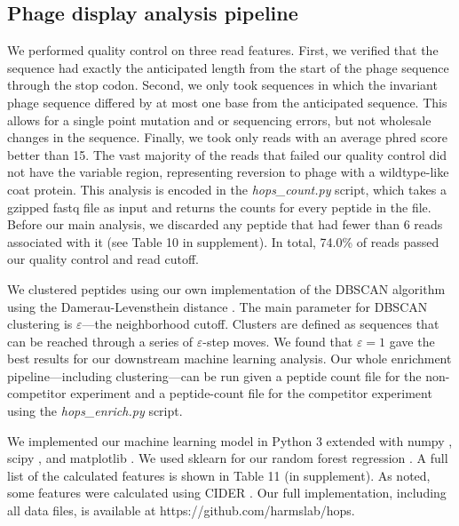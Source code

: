 \subsection{Phage display analysis pipeline}

We performed quality control on three read features. First, we verified
that the sequence had exactly the anticipated length from the start
of the phage sequence through the stop codon. Second, we only took
sequences in which the invariant phage sequence differed by at most
one base from the anticipated sequence. This allows for a single point
mutation and or sequencing errors, but not wholesale changes in the
sequence. Finally, we took only reads with an average phred score
better than 15. The vast majority of the reads that failed our quality
control did not have the variable region, representing reversion to
phage with a wildtype-like coat protein. This analysis is encoded
in the \emph{hops\_count.py }script, which takes a gzipped fastq file
as input and returns the counts for every peptide in the file. Before
our main analysis, we discarded any peptide that had fewer than 6
reads associated with it (see Table 10 in supplement).
In total, 74.0\% of reads passed our quality control and read cutoff. 

We clustered peptides using our own implementation of the DBSCAN algorithm
\citep{ester_density-based_1996} using the Damerau-Levensthein distance
\citep{damerau_technique_1964}. The main parameter for DBSCAN clustering
is $\varepsilon$---the neighborhood cutoff. Clusters are defined as
sequences that can be reached through a series of $\varepsilon$-step
moves. We found that $\varepsilon=1$ gave the best results for our
downstream machine learning analysis. Our whole enrichment pipeline---including
clustering---can be run given a peptide count file for the non-competitor
experiment and a peptide-count file for the competitor experiment
using the \emph{hops\_enrich.py} script.

We implemented our machine learning model in Python 3 extended with
numpy \citep{walt_numpy_2011}, scipy \citep{jones_scipy:_2001},
and matplotlib \citep{hunter_matplotlib:_2007}. We used sklearn for
our random forest regression \citep{breiman_classification_1984,breiman_random_2001,pedregosa_scikit-learn:_2011}.
A full list of the calculated features is shown in Table 11 (in supplement). As noted,
some features were calculated using CIDER \citep{holehouse_cider:_2015}.
Our full implementation, including all data files, is available at
https://github.com/harmslab/hops. 

